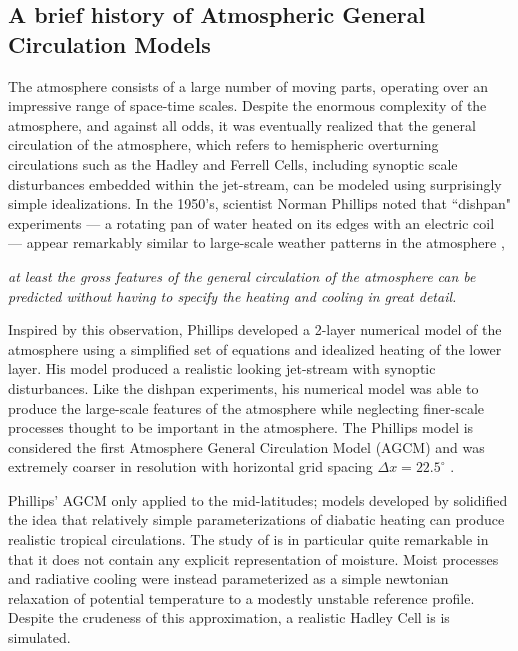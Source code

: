 \subsection{A brief history of Atmospheric General Circulation Models}

The atmosphere consists of a large number of moving parts, operating over an impressive range of space-time scales. Despite the enormous complexity of the atmosphere, and against all odds, it was eventually realized that the general circulation of the atmosphere, which refers to hemispheric overturning circulations such as the Hadley and Ferrell Cells, including synoptic scale disturbances embedded within the jet-stream, can be modeled using surprisingly simple idealizations. In the 1950's, scientist Norman Phillips noted that  ``dishpan" experiments --- a rotating pan of water heated on its edges with an electric coil --- appear remarkably similar to large-scale weather patterns in the atmosphere \citep{WEART2008},
\begin{displayquote}
{\em{at least the gross features of the general circulation of the atmosphere can be predicted without having to specify the heating and cooling in great detail.}}
\end{displayquote}
Inspired by this observation, Phillips developed a 2-layer numerical model of the atmosphere using a simplified set of equations and idealized heating of the lower layer. His model produced a realistic looking jet-stream with synoptic disturbances. Like the dishpan experiments, his numerical model was able to produce the large-scale features of the atmosphere while neglecting finer-scale processes thought to be important in the atmosphere. The Phillips model is considered the first Atmosphere General Circulation Model (AGCM) and was extremely coarser in resolution with horizontal grid spacing $\Delta x = 22.5^{\circ}$ \citep{WEART2008}.

Phillips' AGCM only applied to the mid-latitudes; models developed by \cite{METAL1965MWR, HH1980JAS} solidified the idea that relatively simple parameterizations of diabatic heating can produce realistic tropical circulations. The study of \cite{HH1980JAS} is in particular quite remarkable in that it does not contain any explicit representation of moisture. Moist processes and radiative cooling were instead parameterized as a simple newtonian relaxation of potential temperature to a modestly unstable reference profile. Despite the crudeness of this approximation, a realistic Hadley Cell is is simulated. 

